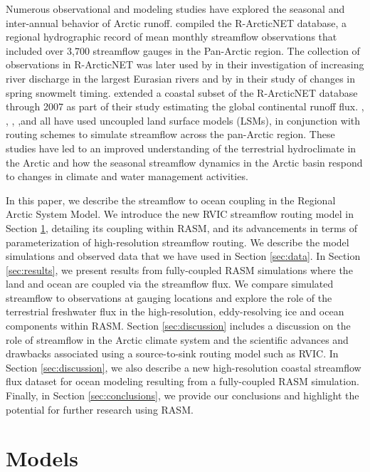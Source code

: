 \documentclass[jgrga, draft]{agutex}
\begin{document}
\begin{article}
Numerous observational and modeling studies have explored the seasonal and inter-annual behavior of Arctic runoff.
\citet{Lammers_2001} compiled the R-ArcticNET database, a regional hydrographic record of mean monthly streamflow observations that included over 3,700 streamflow gauges in the Pan-Arctic region.
The collection of observations in R-ArcticNET was later used by \citet{Shiklomanov_2009} in their investigation of increasing river discharge in the largest Eurasian rivers and by \citet{Tan_2011} in their study of changes in spring snowmelt timing.
\citet{Dai_2009} extended a coastal subset of the R-ArcticNET database through 2007 as part of their study estimating the global continental runoff flux.
\citet{Su_2005}, \citet{Adam_2007}, \citet{Slater_2007}, \citet{Adam_2008},and \citet{Dai_2009} all have used uncoupled land surface models (LSMs), in conjunction with routing schemes to simulate streamflow across the pan-Arctic region.
These studies have led to an improved understanding of the terrestrial hydroclimate in the Arctic and how the seasonal streamflow dynamics in the Arctic basin respond to changes in climate and water management activities.

In this paper, we describe the streamflow to ocean coupling in the Regional Arctic System Model.
We introduce the new RVIC streamflow routing model in Section \ref{sec:models}, detailing its coupling within RASM, and its advancements in terms of parameterization of high-resolution streamflow routing.
We describe the model simulations and observed data that we have used in Section \ref{sec:data}.
In Section \ref{sec:results}, we present results from fully-coupled RASM simulations where the land and ocean are coupled via the streamflow flux.
We compare simulated streamflow to observations at gauging locations and explore the role of the terrestrial freshwater flux in the high-resolution, eddy-resolving ice and ocean components within RASM.
Section \ref{sec:discussion} includes a discussion on the role of streamflow in the Arctic climate system and the scientific advances and drawbacks associated using a source-to-sink routing model such as RVIC.
In Section \ref{sec:discussion}, we also describe a new high-resolution coastal streamflow flux dataset for ocean modeling resulting from a fully-coupled RASM simulation.
Finally, in Section \ref{sec:conclusions}, we provide our conclusions and highlight the potential for further research using RASM.

\section{Models}
\label{sec:models}


\end{article}
\end{document}

